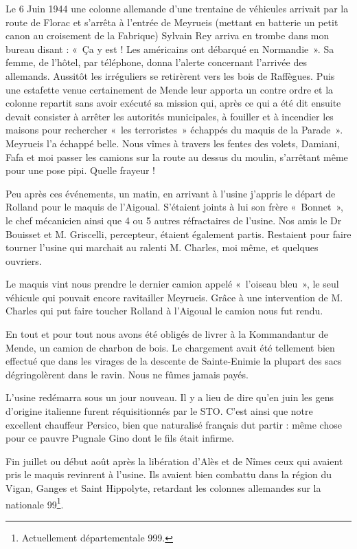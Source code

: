 Le 6 Juin 1944 une colonne allemande d’une trentaine de véhicules arrivait par la route de
Florac et s’arrêta à l’entrée de Meyrueis (mettant en batterie un petit canon au croisement de
la Fabrique) Sylvain Rey arriva en trombe dans mon bureau disant : «~Ça y est ! Les
américains ont débarqué en Normandie~». Sa femme, de l’hôtel, par téléphone, donna l’alerte
concernant l’arrivée des allemands. Aussitôt les irréguliers se retirèrent vers les bois de
Raffègues.
Puis une estafette venue certainement de Mende leur apporta un contre ordre et la colonne
repartit sans avoir exécuté sa mission qui, après ce qui a été dit ensuite devait consister à
arrêter les autorités municipales, à fouiller et à incendier les maisons pour rechercher «~les
terroristes~» échappés du maquis de la Parade~». Meyrueis l’a échappé belle. Nous vîmes à
travers les fentes des volets, Damiani, Fafa et moi passer les camions sur la route au dessus
du moulin, s’arrêtant même pour une pose pipi. Quelle frayeur !


Peu après ces événements, un matin, en arrivant à l’usine j’appris le départ de Rolland pour le
maquis de l’Aigoual. S’étaient joints à lui son frère «~Bonnet~», le chef mécanicien ainsi que
4 ou 5 autres réfractaires de l’usine. Nos amis le Dr Bouisset et M. Griscelli, percepteur,
étaient également partis. Restaient pour faire tourner l’usine qui marchait au ralenti M.
Charles, moi même, et quelques ouvriers.

Le maquis vint nous prendre le dernier camion appelé «~l’oiseau bleu~», le seul véhicule qui
pouvait encore ravitailler Meyrueis. Grâce à une intervention de M. Charles qui put faire
toucher Rolland à l’Aigoual le camion nous fut rendu.

En tout et pour tout nous avons été obligés de livrer à la Kommandantur de Mende, un camion
de charbon de bois. Le chargement avait été tellement bien effectué que dans les virages de la descente de Sainte-Enimie la plupart des sacs dégringolèrent dans le ravin. Nous ne fûmes jamais
payés.

L’usine redémarra sous un jour nouveau. Il y a lieu de dire qu’en juin les gens d’origine
italienne furent réquisitionnés par le STO. C’est ainsi que notre excellent chauffeur Persico,
bien que naturalisé français dut partir : même chose pour ce pauvre Pugnale Gino dont le fils
était infirme.

Fin juillet ou début août après la libération d’Alès et de Nîmes ceux qui avaient pris le
maquis revinrent à l’usine. Ils avaient bien combattu dans la région du Vigan, Ganges et Saint
Hippolyte, retardant les colonnes allemandes sur la nationale 99\footnote{Actuellement départementale 999.}.\\

